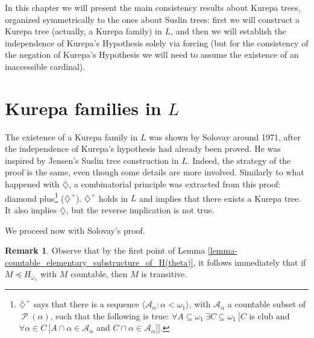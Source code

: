 \documentclass[11pt,a4paper]{report}
\theoremstyle{definition}
\newtheorem*{remark}{Remark}
\theoremstyle{num.custom-title}
\theoremstyle{custom-title}
\DeclareMathOperator{\PP}{\mathcal{P}}
\DeclareMathOperator{\sse}{\subseteq}
\newcommand{\A}{\mathcal{A}}
\begin{document}
In this chapter we will present the main consistency results about Kurepa trees, organized symmetrically to the ones about Suslin trees: first we will construct a Kurepa tree (actually, a Kurepa family) in $L$, and then we will establish the independence of Kurepa's Hypothesis solely via forcing (but for the consistency of the negation of Kurepa's Hypothesis we will need to assume the existence of an inaccessible cardinal).

\section{Kurepa families in $L$}

The existence of a Kurepa family in $L$ was shown by Solovay around 1971, after the independence of Kurepa's hypothesis had already been proved. He was inspired by Jensen’s Suslin tree construction in $L$. Indeed, the strategy of the proof is the same, even though some details are more involved. Similarly to what happened with $\diamondsuit$, a combinatorial principle was extracted from this proof: diamond plus\footnote{$\diamondsuit^+$ says that there is a sequence $\langle \A_\alpha : \alpha < \omega_1 \rangle$, with $\A_\alpha$ a countable subset of $\PP(\alpha)$, such that the following is true: $\forall A \sse \omega_1 \ \exists C \sse \omega_1 \ [C$ is club and $\forall \alpha \in C \ [A \cap \alpha \in \A_\alpha$ and $C \cap \alpha \in \A_\alpha]]$.} ($\diamondsuit^+$). $\diamondsuit^+$ holds in $L$ and implies that there exists a Kurepa tree. It also implies $\diamondsuit$, but the reverse implication is not true.

We proceed now with Solovay's proof.

\begin{remark}
Observe that by the first point of Lemma \ref{lemma-countable_elementary_substructure_of_H(theta)}, it follows immediately that if $M \preceq H_{\omega_1}$ with $M$ countable, then $M$ is transitive.
\end{remark}
\end{document}
